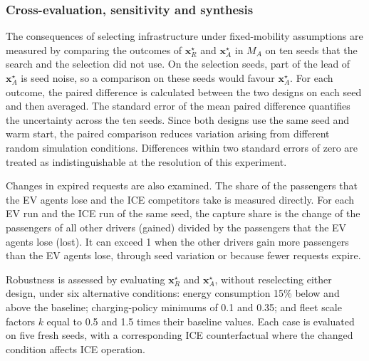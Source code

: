 \documentclass{elsarticle}
\newcommand{\MA}{\ensuremath{M_A}}
\newcommand{\xR}{\ensuremath{\mathbf{x}_R^{\star}}}
\newcommand{\xA}{\ensuremath{\mathbf{x}_A^{\star}}}
\begin{document}
\subsubsection{Cross-evaluation, sensitivity and synthesis}
\label{sec:sensitivity}
\label{sec:synthesis}

The consequences of selecting infrastructure under fixed-mobility assumptions are measured by comparing the outcomes of \(\xR\) and \(\xA\) in \(\MA\) on ten seeds that the search and the selection did not use. On the selection seeds, part of the lead of \(\xA\) is seed noise, so a comparison on these seeds would favour \(\xA\). For each outcome, the paired difference is calculated between the two designs on each seed and then averaged. The standard error of the mean paired difference quantifies the uncertainty across the ten seeds. Since both designs use the same seed and warm start, the paired comparison reduces variation arising from different random simulation conditions. Differences within two standard errors of zero are treated as indistinguishable at the resolution of this experiment.

Changes in expired requests are also examined. The share of the passengers that the EV agents lose and the ICE competitors take is measured directly. For each EV run and the ICE run of the same seed, the capture share is the change of the passengers of all other drivers (gained) divided by the passengers that the EV agents lose (lost). It can exceed 1 when the other drivers gain more passengers than the EV agents lose, through seed variation or because fewer requests expire.

Robustness is assessed by evaluating \(\xR\) and \(\xA\), without reselecting either design, under six alternative conditions: energy consumption 15\% below and above the baseline; charging-policy minimums of 0.1 and 0.35; and fleet scale factors \(k\) equal to 0.5 and 1.5 times their baseline values. Each case is evaluated on five fresh seeds, with a corresponding ICE counterfactual where the changed condition affects ICE operation.
\end{document}
